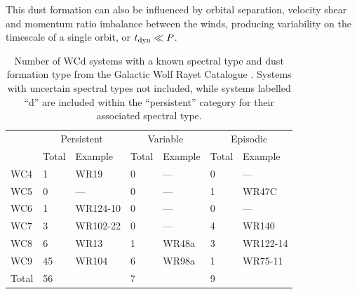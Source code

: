 \noindent
This dust formation can also be influenced by orbital separation, velocity shear and momentum ratio imbalance between the winds, producing variability on the timescale of a single orbit, or $t_\text{dyn} \ll P$.

\begin{table}
  \centering
  \begin{tabular}{lllllll}
    \hline
    & \multicolumn{2}{c}{Persistent} & \multicolumn{2}{c}{Variable} & \multicolumn{2}{c}{Episodic} \\ \cline{2-7} 
    & Total & Example & Total & Example & Total & Example \\ \hline
   WC4 & 1 & WR19 & 0 & --- & 0 & --- \\
   WC5 & 0 & --- & 0 & --- & 1 & WR47C \\
   WC6 & 1 & WR124-10 & 0 & --- & 0 & --- \\
   WC7 & 3 & WR102-22 & 0 & --- & 4 & WR140 \\
   WC8 & 6 & WR13 & 1 & WR48a & 3 & WR122-14 \\
   WC9 & 45 & WR104 & 6 & WR98a & 1 & WR75-11 \\ \hline
   Total & 56 &  & 7 &  & 9 &  \\ \hline
  \end{tabular}
  \caption[Number of confirmed WCd systems]{Number of WCd systems with a known spectral type and dust formation type from the Galactic Wolf Rayet Catalogue \parencite{rossloweSpatialDistributionGalactic2015}. Systems with uncertain spectral types not included, while systems labelled ``d'' are included within the ``persistent'' category for their associated spectral type.}
  \label{tab:p2-wc-summated-list}
\end{table}

